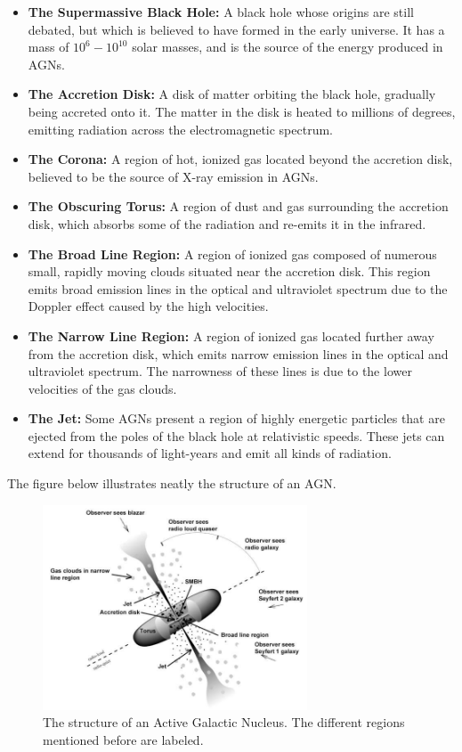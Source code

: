 \begin{itemize}
    \item \textbf{The Supermassive Black Hole:} A black hole whose origins are still debated, but which is believed to have formed in the early universe. It has a mass of $10^6 - 10^{10}$ solar masses, and is the source of the energy produced in AGNs.
    \item \textbf{The Accretion Disk:} A disk of matter orbiting the black hole, gradually being accreted onto it. The matter in the disk is heated to millions of degrees, emitting radiation across the electromagnetic spectrum.
    \item \textbf{The Corona:} A region of hot, ionized gas located beyond the accretion disk, believed to be the source of X-ray emission in AGNs.
    \item \textbf{The Obscuring Torus:} A region of dust and gas surrounding the accretion disk, which absorbs some of the radiation and re-emits it in the infrared.
    \item \textbf{The Broad Line Region:} A region of ionized gas composed of numerous small, rapidly moving clouds situated near the accretion disk. This region emits broad emission lines in the optical and ultraviolet spectrum due to the Doppler effect caused by the high velocities.
    \item \textbf{The Narrow Line Region:} A region of ionized gas located further away from the accretion disk, which emits narrow emission lines in the optical and ultraviolet spectrum. The narrowness of these lines is due to the lower velocities of the gas clouds.
    \item \textbf{The Jet:} Some AGNs present a region of highly energetic particles that are ejected from the poles of the black hole at relativistic speeds. These jets can extend for thousands of light-years and emit all kinds of radiation.
\end{itemize}

The figure below illustrates neatly the structure of an AGN.

\begin{figure}[H]
    \centering
    \includegraphics[width=0.7\textwidth]{Figures/AGN Structure.jpg}
    \caption{The structure of an Active Galactic Nucleus. The different regions mentioned before are labeled.}
    \label{fig:AGN_structure}
\end{figure}


